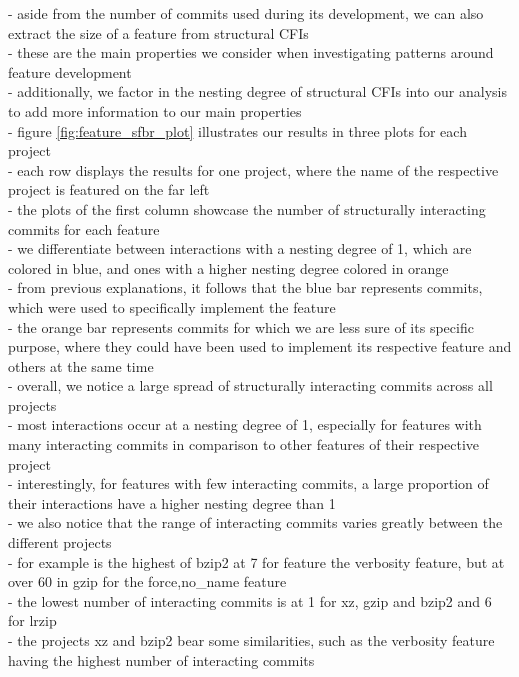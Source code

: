 - aside from the number of commits used during its development, we can also extract the size of a feature from structural CFIs \\
- these are the main properties we consider when investigating patterns around feature development \\
- additionally, we factor in the nesting degree of structural CFIs into our analysis to add more information to our main properties \\
- figure \ref{fig:feature_sfbr_plot} illustrates our results in three plots for each project \\
- each row displays the results for one project, where the name of the respective project is featured on the far left \\
- the plots of the first column showcase the number of structurally interacting commits for each feature \\
- we differentiate between interactions with a nesting degree of 1, which are colored in blue, and ones with a higher nesting degree colored in orange \\
- from previous explanations, it follows that the blue bar represents commits, which were used to specifically implement the feature \\
- the orange bar represents commits for which we are less sure of its specific purpose, where they could have been used to implement its respective feature and others at the same time \\
- overall, we notice a large spread of structurally interacting commits across all projects \\
- most interactions occur at a nesting degree of 1, especially for features with many interacting commits in comparison to other features of their respective project \\
- interestingly, for features with few interacting commits, a large proportion of their interactions have a higher nesting degree than 1 \\
- we also notice that the range of interacting commits varies greatly between the different projects \\
- for example is the highest of bzip2 at 7 for feature the verbosity feature, but at over 60 in gzip for the force,no\_name feature \\
- the lowest number of interacting commits is at 1 for xz, gzip and bzip2 and 6 for lrzip \\
- the projects xz and bzip2 bear some similarities, such as the verbosity feature having the highest number of interacting commits \\
